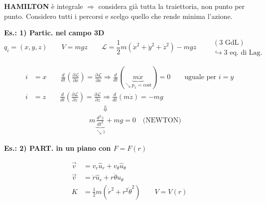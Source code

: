 \documentclass[12pt,a4paper]{article}
\begin{document}

\vspace{0.3cm}
\noindent \textbf{HAMILTON} è integrale $\Rightarrow$ considera già tutta la traiettoria, non punto per punto. Considero tutti i percorsi e scelgo quello che rende minima l'azione.

\vspace{0.5cm}
\noindent \textbf{Es.: 1) Partic. nel campo 3D}
\begin{equation*}
    q_i = (x, y, z) \qquad V = mgz \qquad \mathcal{L} = \frac{1}{2}m(\dot{x}^2 + \dot{y}^2 + \dot{z}^2) - mgz \qquad 
    \begin{matrix}
        (3 \text{ GdL}) \\ \hookrightarrow 3 \text{ eq. di Lag.}
    \end{matrix}
\end{equation*}

\vspace{0.3cm}
\begin{align*}
    i &= x \qquad \frac{d}{dt}\left(\frac{\partial \mathcal{L}}{\partial \dot{x}}\right) = \frac{\partial \mathcal{L}}{\partial x} \Rightarrow \frac{d}{dt}(\underbrace{m\dot{x}}_{\searrow p_x = \text{cost}}) = 0 \qquad \text{uguale per } i=y \\
    i &= z \qquad \frac{d}{dt}\left(\frac{\partial \mathcal{L}}{\partial \dot{z}}\right) = \frac{\partial \mathcal{L}}{\partial z} \Rightarrow \frac{d}{dt}(m\dot{z}) = -mg \\
    & \qquad\qquad\qquad\qquad\qquad \Downarrow \\
    & \qquad\qquad\qquad\qquad m \underbrace{\frac{d^2 z}{dt^2}}_{\searrow \ddot{z}} + mg = 0 \quad \text{(NEWTON)}
\end{align*}

\vspace{0.5cm}
\noindent \textbf{Es.: 2) PART. in un piano con $F = F(r)$}


\begin{align*}
    \vec{v} &= v_r \hat{u}_r + v_\theta \hat{u}_\theta \\
    \vec{v} &= \dot{r} \hat{u}_r + r\dot{\theta} \hat{u}_\theta \\
    K &= \frac{1}{2}m(\dot{r}^2 + r^2\dot{\theta}^2) \qquad V = V(r)
\end{align*}
\end{document}
